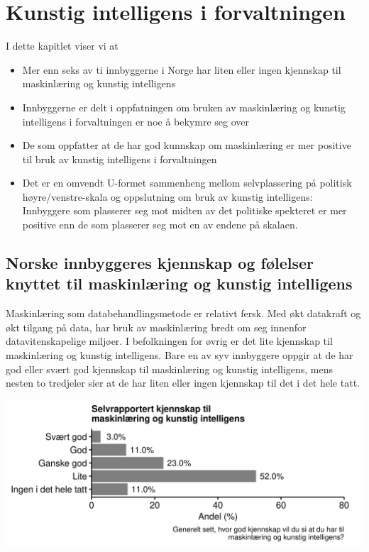 \documentclass[
]{book}
\begin{document}
\hypertarget{kunstig-intelligens-i-forvaltningen}{%
\chapter{Kunstig intelligens i forvaltningen}\label{kunstig-intelligens-i-forvaltningen}}

I dette kapitlet viser vi at

\begin{itemize}
\item
  Mer enn seks av ti innbyggerne i Norge har liten eller ingen kjennskap til maskinlæring og kunstig intelligens
\item
  Innbyggerne er delt i oppfatningen om bruken av maskinlæring og kunstig intelligens i forvaltningen er noe å bekymre seg over
\item
  De som oppfatter at de har god kunnskap om maskinlæring er mer positive til bruk av kunstig intelligens i forvaltningen
\item
  Det er en omvendt U-formet sammenheng mellom selvplassering på politisk høyre/venstre-skala og oppslutning om bruk av kunstig intelligens:
  Innbyggere som plasserer seg mot midten av det politiske spekteret er mer positive enn de som plasserer seg mot en av endene på skalaen.
\end{itemize}

\hypertarget{norske-innbyggeres-kjennskap-og-fuxf8lelser-knyttet-til-maskinluxe6ring-og-kunstig-intelligens}{%
\section{Norske innbyggeres kjennskap og følelser knyttet til maskinlæring og kunstig intelligens}\label{norske-innbyggeres-kjennskap-og-fuxf8lelser-knyttet-til-maskinluxe6ring-og-kunstig-intelligens}}

Maskinlæring som databehandlingsmetode er relativt fersk.
Med økt datakraft og økt tilgang på data, har bruk av maskinlæring bredt om seg innenfor datavitenskapelige miljøer.
I befolkningen for øvrig er det lite kjennskap til maskinlæring og kunstig intelligens.
Bare en av syv innbyggere oppgir at de har god eller svært god kjennskap til maskinlæring og kunstig intelligens, mens nesten to tredjeler sier at de har liten eller ingen kjennskap til det i det hele tatt.

\includegraphics{figs/png/fig_ml_knowledge.png}
\end{document}
